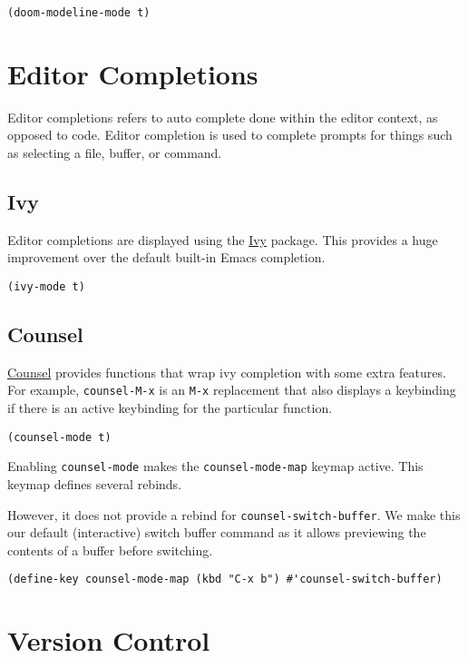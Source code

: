 \documentclass[11pt]{article}
\begin{document}
\begin{verbatim}
(doom-modeline-mode t)
\end{verbatim}
\section{Editor Completions}
\label{sec:org78ab2f4}

Editor completions refers to auto complete done within the editor context, as
opposed to code. Editor completion is used to complete prompts for things such
as selecting a file, buffer, or command.
\subsection{Ivy}
\label{sec:org64f2bb9}

Editor completions are displayed using the \href{https://github.com/abo-abo/swiper?tab=readme-ov-file\#ivy}{Ivy} package. This provides a huge
improvement over the default built-in Emacs completion.

\begin{verbatim}
(ivy-mode t)
\end{verbatim}
\subsection{Counsel}
\label{sec:orgf43f727}

\href{https://github.com/abo-abo/swiper?tab=readme-ov-file\#counsel}{Counsel} provides functions that wrap ivy completion with some extra
features. For example, \texttt{counsel-M-x} is an \texttt{M-x} replacement that also displays
a keybinding if there is an active keybinding for the particular function.

\begin{verbatim}
(counsel-mode t)
\end{verbatim}

Enabling \texttt{counsel-mode} makes the \texttt{counsel-mode-map} keymap active. This keymap
defines several rebinds.


However, it does not provide a rebind for \texttt{counsel-switch-buffer}. We make this
our default (interactive) switch buffer command as it allows previewing the
contents of a buffer before switching.

\begin{verbatim}
(define-key counsel-mode-map (kbd "C-x b") #'counsel-switch-buffer)
\end{verbatim}
\section{Version Control}
\label{sec:org700cf5f}
\end{document}

